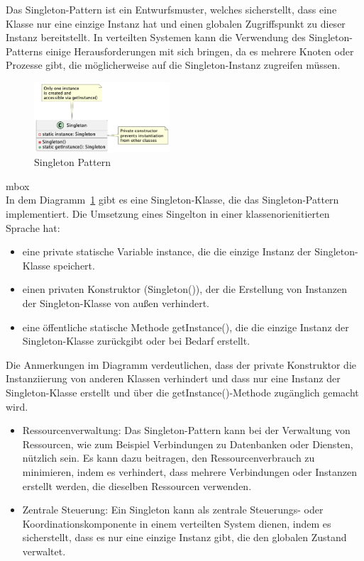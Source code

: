 \documentclass[../vs-script-first-v01.tex]{subfiles}
\begin{document}
Das Singleton-Pattern ist ein Entwurfsmuster, welches sicherstellt, dass eine Klasse nur eine einzige Instanz hat und einen globalen Zugriffspunkt zu dieser Instanz bereitstellt. In verteilten Systemen kann die Verwendung des Singleton-Patterns einige Herausforderungen mit sich bringen, da es mehrere Knoten oder Prozesse gibt, die möglicherweise auf die Singleton-Instanz zugreifen müssen.
\begin{figure}[!ht]
  \centering
  \includegraphics[width=0.45\textwidth]{fig/uml/singleton.png}
  \caption{Singleton Pattern}
  \label{fig:singleton}
\end{figure}
mbox{}\\
In dem Diagramm~\ref{fig:singleton} gibt es eine Singleton-Klasse, die das Singleton-Pattern implementiert. Die Umsetzung eines Singelton in einer klassenorienitierten Sprache hat:
\begin{itemize}
\item eine private statische Variable instance, die die einzige Instanz der Singleton-Klasse speichert.
\item einen privaten Konstruktor (Singleton()), der die Erstellung von Instanzen der Singleton-Klasse von außen verhindert.
\item eine öffentliche statische Methode getInstance(), die die einzige Instanz der Singleton-Klasse zurückgibt oder bei Bedarf erstellt.
\end{itemize}
Die Anmerkungen im Diagramm verdeutlichen, dass der private Konstruktor die Instanziierung von anderen Klassen verhindert und dass nur eine Instanz der Singleton-Klasse erstellt und über die getInstance()-Methode zugänglich gemacht wird.
\begin{itemize}
\item Ressourcenverwaltung: Das Singleton-Pattern kann bei der Verwaltung von Ressourcen, wie zum Beispiel Verbindungen zu Datenbanken oder Diensten, nützlich sein. Es kann dazu beitragen, den Ressourcenverbrauch zu minimieren, indem es verhindert, dass mehrere Verbindungen oder Instanzen erstellt werden, die dieselben Ressourcen verwenden.
\item Zentrale Steuerung: Ein Singleton kann als zentrale Steuerungs- oder Koordinationskomponente in einem verteilten System dienen, indem es sicherstellt, dass es nur eine einzige Instanz gibt, die den globalen Zustand verwaltet.
\end{itemize}
\end{document}
